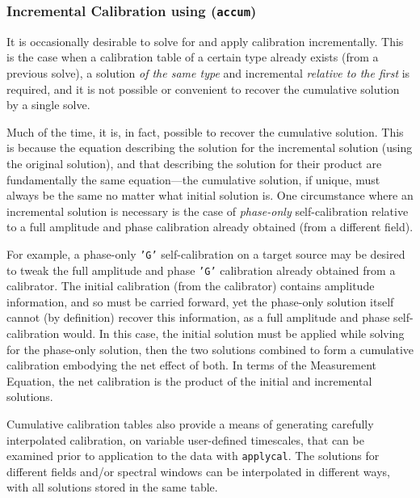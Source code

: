 
\subsubsection{Incremental Calibration using ({\tt accum})}
\label{section:cal.tables.accum.incr}

It is occasionally desirable to solve for and apply calibration
incrementally.  This is the case when a calibration table of a certain
type already exists (from a previous solve), a solution {\it of the
same type} and incremental {\it relative to the first} is required,
and it is not possible or convenient to recover the cumulative
solution by a single solve.

Much of the time, it is, in fact, possible to recover the cumulative
solution. This is because the equation describing the solution for the
incremental solution (using the original solution), and that describing
the solution for their product are fundamentally the same equation---the
cumulative solution, if unique, must always be the same no matter what
initial solution is.  One circumstance where an incremental solution is
necessary is the case of {\it phase-only} self-calibration relative to a
full amplitude and phase calibration already obtained (from a different
field).

For example, a phase-only {\tt 'G'} self-calibration on a target source may be
desired to tweak the full amplitude and phase {\tt 'G'} calibration already
obtained from a calibrator. The initial calibration (from the calibrator)
contains amplitude information, and so must be carried forward, yet the
phase-only solution itself cannot (by definition) recover this
information, as a full amplitude and phase self-calibration would. In this
case, the initial solution must be applied while solving for the
phase-only solution, then the two solutions combined to form a cumulative
calibration embodying the net effect of both. In terms of the Measurement
Equation, the net calibration is the product of the initial and
incremental solutions.

Cumulative calibration tables also provide a means of generating
carefully interpolated calibration, on variable user-defined
timescales, that can be examined prior to application to the data with
{\tt applycal}. The solutions for different fields and/or spectral
windows can be interpolated in different ways, with all solutions
stored in the same table.

